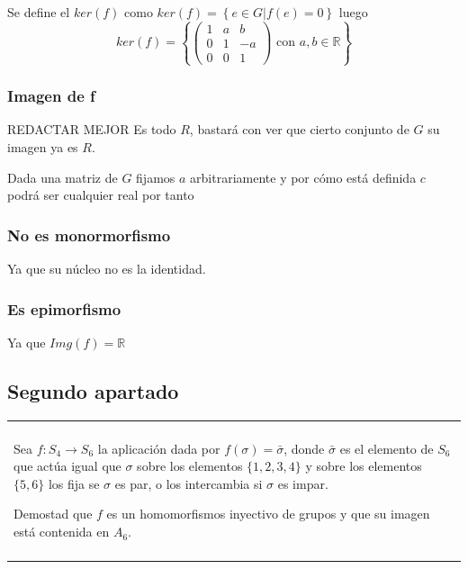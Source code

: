 \documentclass[12pt]{article}
\newenvironment{micaja}
{
    \begin{center}
    \begin{tabular}{|p{0.9\textwidth}|}
    \hline\\
    }   
    {   
    \\\\\hline
    \end{tabular} 
    \end{center}
    }
\begin{document}
Se define el $ker(f)$  como   $ker(f) = \left\{ e \in G | f(e) = 0\right\}$
luego 
\begin{equation*}
    ker(f) = \left\{ \begin{pmatrix}
        1 & a & b \\
        0 & 1 & -a \\
        0 & 0 & 1
        \end{pmatrix} \text{ con  } a,b \in \mathbb R\right\}
\end{equation*}

\subsubsection*{Imagen de f}
REDACTAR MEJOR
Es todo $R$, bastará con ver que cierto conjunto de $G$
su imagen ya es $R.$

Dada una matriz de $G$ fijamos $a$ arbitrariamente
y por cómo está definida $c$ podrá ser cualquier real  por tanto 


\subsubsection*{No es monormorfismo}
Ya que su núcleo no es la identidad.

\subsubsection*{Es epimorfismo}
Ya que $Img(f) = \mathbb R$

\newpage
\subsection{Segundo apartado}

\begin{micaja}
    Sea $f:S_4 \rightarrow S_6$ la aplicación dada por
    $f(\sigma) = \bar \sigma$, donde $\bar \sigma$
    es el elemento de $S_6$ que actúa igual que $\sigma$
    sobre los elementos $\{1,2,3,4\}$ y sobre los elementos
    $\{5,6\}$ los fija se $\sigma$ es par, o los intercambia
    si $\sigma$ es impar.

    Demostad que $f$ es un homomorfismos 
    inyectivo de grupos y que su imagen está contenida en $A_6.$
\end{micaja}
\end{document}
